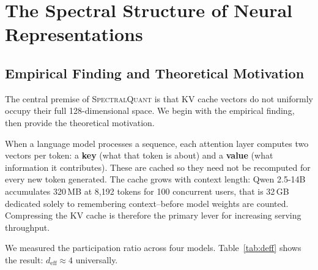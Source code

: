 \documentclass[11pt]{article}
\newcommand{\deff}{d_{\mathrm{eff}}}
\newcommand{\SQ}{\textsc{SpectralQuant}}
\begin{document}
\section{The Spectral Structure of Neural Representations}
\label{sec:spectral}

\subsection{Empirical Finding and Theoretical Motivation}
\label{subsec:spectral_main}

The central premise of \SQ{} is that KV cache vectors do not uniformly
occupy their full 128-dimensional space.  We begin with the empirical finding,
then provide the theoretical motivation.

\begin{conceptbox}
\label{box:kvcache}
When a language model processes a sequence, each attention layer computes two
vectors per token: a \textbf{key} (what that token is about) and a
\textbf{value} (what information it contributes).  These are cached so they
need not be recomputed for every new token generated.  The cache grows with
context length: Qwen 2.5-14B accumulates 320\,MB at 8{,}192 tokens for 100
concurrent users, that is 32\,GB dedicated solely to remembering
context--before model weights are counted.  Compressing the KV cache is
therefore the primary lever for increasing serving throughput.
\end{conceptbox}

We measured the participation ratio across four models.  Table~\ref{tab:deff}
shows the result: $\deff \approx 4$ universally.
\end{document}
